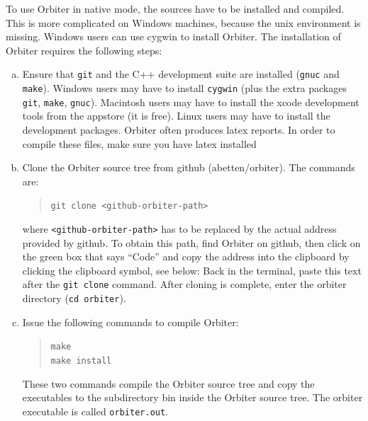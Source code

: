 \bigskip

To use Orbiter in native mode, the sources have to be installed and compiled. 
This is more complicated on Windows machines, because the unix environment is missing. 
Windows users can use cygwin to install Orbiter.
The installation of Orbiter requires the following steps:
\begin{enumerate}[(a)]
\item
Ensure that \verb'git' and the C++ development suite are installed (\verb'gnuc' and \verb'make'). 
Windows users may have to install \verb'cygwin' 
(plus the extra packages \verb'git', \verb'make', \verb'gnuc'). 
Macintosh users may have to install the xcode development tools from the appstore (it is free).
Linux users may have to install the development packages.
Orbiter often produces latex reports. 
In order to compile these files, make sure you have latex installed 
\item
Clone the Orbiter source tree from github (abetten/orbiter).
The commands are: 
\begin{quote}
\verb'git clone <github-orbiter-path>'
\end{quote}
where \verb'<github-orbiter-path>'  has to be replaced by the actual address provided by github. 
To obtain this path, find Orbiter on github, 
then click on the green box that says ``Code'' 
and copy the address into the clipboard by clicking the clipboard symbol, see below:
Back in the terminal, paste this text after the \verb'git clone' command.
After cloning is complete, enter the orbiter directory (\verb'cd orbiter').
\item
Issue the following commands to compile Orbiter:
\begin{quote}
\verb'make'\\
\verb'make install'\\
\end{quote}
These two commands compile the Orbiter source tree and copy 
the executables to the subdirectory bin inside the Orbiter source tree. 
The orbiter executable is called \verb'orbiter.out'. 
\end{enumerate}

